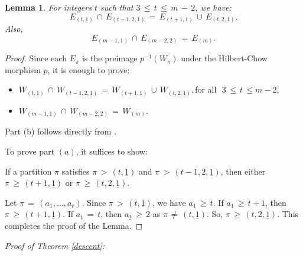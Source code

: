 \documentclass[12pt,reqno]{amsart}
\newtheorem{lemma}{Lemma}[section]
\theoremstyle{definition}
\numberwithin{equation}{section}
\begin{document}
\begin{lemma}\label{capcup}
For integers $t$ such that $3\,\leq\,t\,\leq\, m\,-\,2$, we have:
$$E_{(t, \underline{1})}\,\cap\, E_{(t-1, 2, \underline{1})}\,=\, E_{(t+1,\underline{1})}\,\cup\, E_{(t,2,\underline{1})}.$$
Also,
$$E_{(m-1,1)}\,\cap\, E_{(m-2, 2)}\,=\, E_{(m)}.$$   
\end{lemma}
\begin{proof}
Since each $E_{\pi}$ is the preimage $p^{-1}(W_{\pi})$ under the Hilbert-Chow morphism $p$, it is enough to prove:
\begin{itemize}
\item[$(a)$] $W_{(t,\underline{1})}\,\cap\, W_{(t-1,2,\underline{1})}\,=\, W_{(t+1,\underline{1})}\,\cup\, W_{(t,2,\underline{1})},$\quad\textrm{for all}\,\, $3\,\leq\,t\,\leq m-2$, 
\item[$(b)$] $W_{(m-1,1)}\,\cap\,W_{(m-2,2)}\,=\, W_{(m)}$.
\end{itemize}
Part (b) follows directly from {\cite[Lemma 2.1(v)]{BSV3}}.

To prove part $(a)$, it suffices to show: 

If a partition $\pi$ satisfies $\pi\,>\,(t,\underline{1})$ and $\pi\,>\,(t-1, 2, \underline{1})$, then either $\pi\,\geq\,(t+1,\underline{1})$ or $\pi\,\geq\, (t, 2, \underline{1})$.

Let $\pi\,=\, (a_{1},\ldots,a_{r})$. Since $\pi\,>\, (t, \underline{1})$, we have $a_{1}\,\geq\, t$. If $a_{1}\,\geq\, t+1$, then $\pi\,\geq\, (t+1,\underline{1})$. If $a_{1}\,=\, t$, then $a_{2}\,\geq\, 2$ as $\pi\,\neq\, (t,\underline{1})$. So, $\pi\,\geq\,(t, 2, \underline{1})$. This completes the proof of the Lemma.
\end{proof}

\textit{Proof of Theorem \ref{descent}:}
\end{document}
